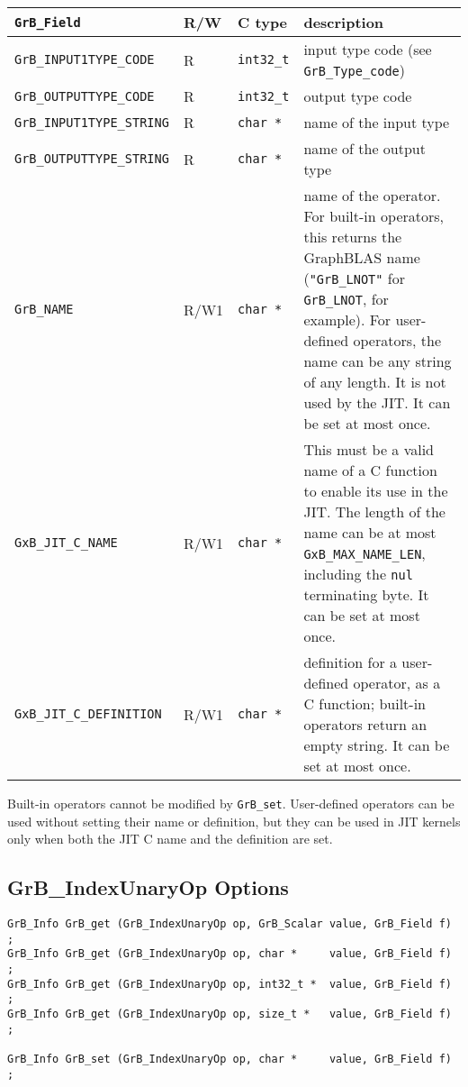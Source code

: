 \noindent
{\small
\begin{tabular}{|l|l|l|p{2.8in}|}
\hline
\verb'GrB_Field'                    & R/W  & C type        & description \\
\hline
\verb'GrB_INPUT1TYPE_CODE'          & R    & \verb'int32_t'& input type code (see \verb'GrB_Type_code') \\
\verb'GrB_OUTPUTTYPE_CODE'          & R    & \verb'int32_t'& output type code \\
\verb'GrB_INPUT1TYPE_STRING'        & R    & \verb'char *' & name of the input type \\
\verb'GrB_OUTPUTTYPE_STRING'        & R    & \verb'char *' & name of the output type \\
\hline
\verb'GrB_NAME'                     & R/W1 & \verb'char *' &    %
    name of the operator.  For built-in operators, this returns the GraphBLAS
    name (\verb'"GrB_LNOT"' for \verb'GrB_LNOT', for example).
    For user-defined operators, the name can be any string of any length.  It
    is not used by the JIT.  It can be set at most once. \\
\verb'GxB_JIT_C_NAME'               & R/W1 & \verb'char *' &
    This must be a valid name of a C function to enable its use in the JIT.
    The length of the name can be at most \verb'GxB_MAX_NAME_LEN', including
    the \verb'nul' terminating byte.  It can be set at most once. \\
\verb'GxB_JIT_C_DEFINITION'         & R/W1 & \verb'char *' &
    definition for a user-defined operator, as a C function; built-in operators
    return an empty string.  It can be set at most once. \\
\hline
\end{tabular}
}

Built-in operators cannot be modified by \verb'GrB_set'.  User-defined
operators can be used without setting their name or definition, but they can be
used in JIT kernels only when both the JIT C name and the definition are set.

\newpage
\subsection{{\sf GrB\_IndexUnaryOp} Options}
\label{get_set_idxunop}

\begin{mdframed}[userdefinedwidth=6in]
{\footnotesize
\begin{verbatim}
GrB_Info GrB_get (GrB_IndexUnaryOp op, GrB_Scalar value, GrB_Field f) ;
GrB_Info GrB_get (GrB_IndexUnaryOp op, char *     value, GrB_Field f) ;
GrB_Info GrB_get (GrB_IndexUnaryOp op, int32_t *  value, GrB_Field f) ;
GrB_Info GrB_get (GrB_IndexUnaryOp op, size_t *   value, GrB_Field f) ;

GrB_Info GrB_set (GrB_IndexUnaryOp op, char *     value, GrB_Field f) ;
\end{verbatim}
}\end{mdframed}

